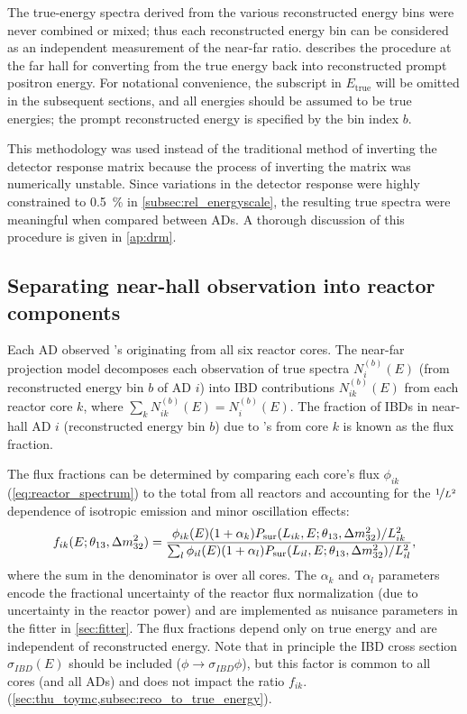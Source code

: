 The true-energy spectra derived from the various reconstructed energy bins
were never combined or mixed;
thus each reconstructed energy bin can be considered as an independent measurement
of the near-far ratio.
 describes the procedure at the far hall
for converting from the true \nuebar{} energy back into reconstructed prompt positron energy.
For notational convenience, the subscript in $E_{\text{true}}$ will be omitted
in the subsequent sections,
and all energies should be assumed to be true \nuebar{} energies;
the prompt reconstructed energy is specified by the bin index $b$.

This methodology was used instead of the traditional method of
inverting the detector response matrix
because the process of inverting the matrix was numerically unstable.
Since variations in the detector response were highly constrained
to \SI{0.5}{\percent} in \cref{subsec:rel_energyscale},
the resulting true \nuebar{} spectra were meaningful when compared between ADs.
A thorough discussion of this procedure is given in \cref{ap:drm}.

\subsection{Separating near-hall observation into reactor components}
\label{subsec:flux_fraction}

Each AD observed \nuebar{}'s originating from all six reactor cores.
The near-far projection model decomposes each observation
of true \nuebar{} spectra $N_i^{(b)}(E)$
(from reconstructed energy bin $b$ of AD $i$)
into IBD contributions $N_{ik}^{(b)}(E)$ from each reactor core $k$,
where $\sum_k N_{ik}^{(b)}(E) = N_i^{(b)}(E)$.
The fraction of IBDs in near-hall AD $i$
(reconstructed energy bin $b$)
due to \nuebar{}'s from core $k$ is known as the flux fraction.

The flux fractions can be determined
by comparing each core's \nuebar{} flux $\phi_{ik}$ (\cref{eq:reactor_spectrum})
to the total from all reactors and
accounting for the $\nicefrac{1}{L^2}$ dependence of isotropic \nuebar{} emission
and minor oscillation effects:
\begin{equation}\label{eq:flux_fraction}
    f_{ik}(E;\theta_{13},\Delta m^2_{32}) = \frac{
        \phi_{ik}(E)(1+\alpha_k) P_\text{sur} (L_{ik}, E;\theta_{13},\Delta m^2_{32})/L_{ik}^2
    }{
    \sum_l \phi_{il}(E)(1+\alpha_l)P_\text{sur}(L_{il}, E;\theta_{13},\Delta m^2_{32})/L_{il}^2
    },
\end{equation}
where the sum in the denominator is over all cores.
The $\alpha_k$ and $\alpha_l$ parameters
encode the fractional uncertainty of the reactor flux normalization
(due to uncertainty in the reactor power)
and are implemented as nuisance parameters in the fitter in \cref{sec:fitter}.
The flux fractions depend only on true \nuebar{} energy
and are independent of reconstructed energy.
Note that in principle the IBD cross section $\sigma_{IBD}(E)$
should be included ($\phi \to \sigma_{IBD}\phi$),
but this factor is common to all cores (and all ADs)
and does not impact the ratio $f_{ik}$.
(\cref{sec:thu_toymc,subsec:reco_to_true_energy}).


